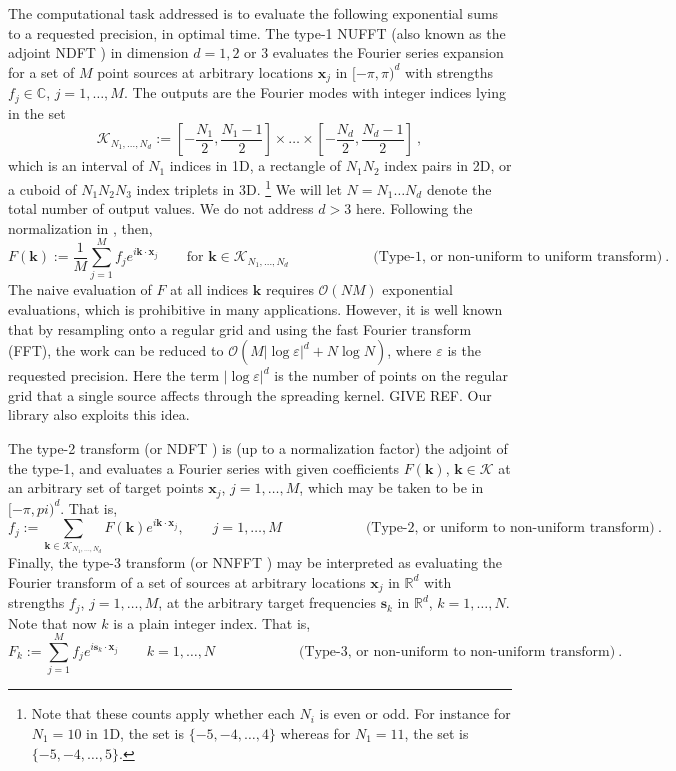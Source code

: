 \documentclass[10pt]{article}
\newcommand{\be}{\begin{equation}}
\newcommand{\ee}{\end{equation}}
\newcommand{\mbf}[1]{{\mathbf #1}}
\newcommand{\RR}{\mathbb{R}}
\newcommand{\eps}{\varepsilon}
\newcommand{\bigO}{{\mathcal O}}
\newcommand{\xx}{\mbf{x}}
\newcommand{\sss}{\mbf{s}}
\newcommand{\kk}{\mbf{k}}
\newcommand{\KK}{{\mathcal K}}
\newcommand{\NU}{{non-uniform}}
\newcommand{\U}{{uniform}}
\begin{document}
The computational task addressed
is to evaluate the following exponential sums to a requested precision,
in optimal time.
The type-1 NUFFT (also known as the adjoint NDFT \cite{usingnfft})
in dimension $d=1,2$ or 3
evaluates the Fourier series expansion for a set of
$M$ point sources at arbitrary locations $\xx_j$ in $[-\pi,\pi)^d$ with
strengths $f_j\in\mathbb{C}$,  $j=1,\dots,M$.
The outputs are the Fourier modes with integer indices lying in
the set
\be
\KK_{N_1,\dots,N_d} :=  \left[-\frac{N_1}{2},\frac{N_1-1}{2}\right]
\times \dots \times \left[-\frac{N_d}{2},\frac{N_d-1}{2}\right]
~,
\label{KK}
\ee
which is an interval of $N_1$ indices in 1D, a rectangle of $N_1N_2$
index pairs in 2D, or a cuboid of $N_1N_2N_3$ index triplets in 3D.%
\footnote{Note that these counts apply whether each $N_i$ is even or odd.
  For instance for $N_1=10$ in 1D, the set is $\{-5,-4,\dots,4\}$
  whereas for $N_1=11$, the set is $\{-5,-4,\dots,5\}$.
}
We will let $N=N_1\dots N_d$ denote the total number of output values.
We do not address $d>3$ here.
Following the normalization in \cite{dutt,nufft}, then,
\be
F(\kk) := \frac{1}{M} \sum_{j=1}^M f_j e^{i \kk\cdot \xx_j}
\qquad \mbox{for } \kk \in \KK_{N_1,\dots,N_d}
\hspace{1in} \mbox{(Type-1, or \NU\ to \U\ transform)}
~.
\label{1}
\ee
The naive evaluation of $F$ at all indices $\kk$ requires $\bigO(NM)$
exponential evaluations, which is prohibitive
in many applications.
However, it is well known that by resampling onto a regular
grid and using the fast Fourier transform (FFT),
the work can be reduced to $\bigO(M |\log\eps|^d + N \log N)$,
where $\eps$ is the requested precision.
Here the term $|\log\eps|^d$ is the number of points on the regular
grid that a single source affects through the spreading kernel.
GIVE REF.
Our library also exploits this idea.

The type-2 transform (or NDFT \cite{usingnfft})
is (up to a normalization factor) the adjoint of the
type-1, and evaluates a Fourier series with given coefficients
$F(\kk)$, $\kk\in\KK$ at an arbitrary set of target points
$\xx_j$, $j=1,\ldots,M$, which may be taken to be in $[-\pi,pi)^d$.
  That is,
  \be
  f_j := \sum_{\kk\in\KK_{N_1,\dots,N_d}} F(\kk) e^{i \kk\cdot \xx_j},
  \qquad j=1,\dots, M
\hspace{1in} \mbox{(Type-2, or \U\ to \NU\ transform)}
~.
\label{2}
\ee
Finally, the type-3 transform
\cite{nufft3} (or NNFFT \cite{usingnfft})
may be interpreted as evaluating the
Fourier transform of a set of sources at arbitrary locations $\xx_j$
in $\RR^d$
with strengths $f_j$, $j=1,\dots, M$, at the arbitrary target frequencies
$\sss_k$ in $\RR^d$, $k=1,\dots, N$. Note that now $k$ is a plain integer
index.
That is,
\be
F_k := \sum_{j=1}^M f_j e^{i \sss_k \cdot \xx_j}
  \qquad k=1,\dots, N
\hspace{1in} \mbox{(Type-3, or \NU\ to \NU\ transform)}
~.
\label{3}
\ee
\end{document}
